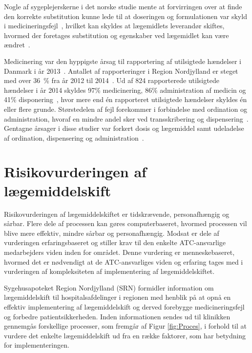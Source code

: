 Nogle af sygeplejerskerne i det norske studie mente at forvirringen over at finde den korrekte substitution kunne lede til at doseringen og formulationen var skyld i medicineringsfejl~\citep{Hakonsen2010}, hvilket kan skyldes at lægemidlets leverandør skiftes, hvormed der foretages substitution og egenskaber ved lægemidlet kan være ændret~\citep{Wittich2014}.

Medicinering var den hyppigste årsag til rapportering af utilsigtede hændelser i Danmark i år 2013~\citep{Patientombuddet2013}. Antallet af rapporteringer i Region Nordjylland er steget med over 36~\% fra år 2012 til 2014~\citep{Jensen2014}. Ud af 824 rapporterede utilsigtede hændelser i år 2014 skyldes 97\% medicinering, 86\% administration af medicin og 41\% disponering~\citep{Jensen2014}, hvor mere end én rapporteret utilsigtede hændelser skyldes én eller flere grunde. Størstedelen af fejl forekommer i forbindelse med ordination og administration, hvoraf en mindre andel sker ved transskribering og dispensering~\citep{Agrawal2009, Anderson2002}. Gentagne årsager i disse studier var forkert dosis og lægemiddel samt udeladelse af ordination, dispensering og administration~\citep{Barker2002,Sundhedsstyrelsen2005,Lisby2005, Tully2009}.

\section{Risikovurderingen af lægemiddelskift} \label{sec:ImpLaeg}
Risikovurderingen af lægemiddelskiftet er tidskrævende, personafhængig og sårbar. Flere dele af processen kan gøres computerbaseret, hvormed processen vil blive mere effektiv, mindre sårbar og personafhængig. Modsat er dele af vurderingen erfaringsbaseret og stiller krav til den enkelte ATC-ansvarlige medarbejders viden inden for området. Denne vurdering er menneskebaseret, hvormed det er nødvendigt at de ATC-ansvarliges viden og erfaring tages med i vurderingen af kompleksiteten af implementering af lægemiddelskiftet. 

Sygehusapoteket Region Nordjylland (SRN) formidler information om lægemiddelskift til hospitalsafdelinger i regionen med henblik på at opnå en effektiv implementering af lægemiddelskift og derved forebygge medicineringsfejl og forbedre patientsikkerheden. Inden informationen sendes ud til klinikken gennemgås forskellige processer, som fremgår af Figur \ref{fig:Proces}, i forhold til at vurdere det enkelte lægemiddelskift ud fra en række faktorer, som har betydning for implementeringen.

